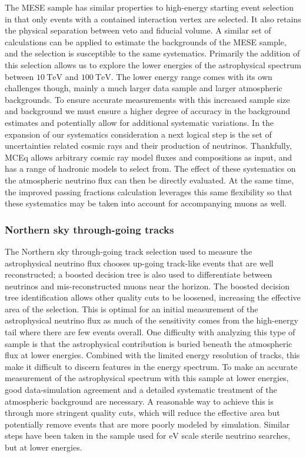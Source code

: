 The MESE sample has similar properties to high-energy starting event selection in that only events with a contained interaction vertex are selected.
It also retains the physical separation between veto and fiducial volume.
A similar set of calculations can be applied to estimate the backgrounds of the MESE sample, and the selection is susceptible to the same systematics.
Primarily the addition of this selection allows us to explore the lower energies of the astrophysical spectrum between $\SI{10}\TeV$ and $\SI{100}\TeV$.
The lower energy range comes with its own challenges though, mainly a much larger data sample and larger atmospheric backgrounds.
To ensure accurate measurements with this increased sample size and background we must ensure a higher degree of accuracy in the background estimates and potentially allow for additional systematic variations.
In the expansion of our systematics consideration a next logical step is the set of uncertainties related cosmic rays and their production of neutrinos.
Thankfully, MCEq allows arbitrary cosmic ray model fluxes and compositions as input, and has a range of hadronic models to select from. The effect of these systematics on the atmospheric neutrino flux can then be directly evaluated.
At the same time, the improved passing fractions calculation leverages this same flexibility so that these systematics may be taken into account for accompanying muons as well.

\subsubsection{Northern sky through-going tracks}
The Northern sky through-going track selection used to measure the astrophysical neutrino flux chooses up-going track-like events that are well reconstructed; a boosted decision tree is also used to differentiate between neutrinos and mis-reconstructed muons near the horizon.
The boosted decision tree identification allows other quality cuts to be loosened, increasing the effective area of the selection.
This is optimal for an initial measurement of the astrophysical neutrino flux as much of the sensitivity comes from the high-energy tail where there are few events overall.
One difficulty with analyzing this type of sample is that the astrophysical contribution is buried beneath the atmospheric flux at lower energies.
Combined with the limited energy resolution of tracks, this make it difficult to discern features in the energy spectrum.
To make an accurate measurement of the astrophysical spectrum with this sample at lower energies, good data-simulation agreement and a detailed systematic treatment of the atmospheric background are necessary.
A reasonable way to achieve this is through more stringent quality cuts, which will reduce the effective area but potentially remove events that are more poorly modeled by simulation.
Similar steps have been taken in the sample used for $\si\eV$ scale sterile neutrino searches, but at lower energies.

